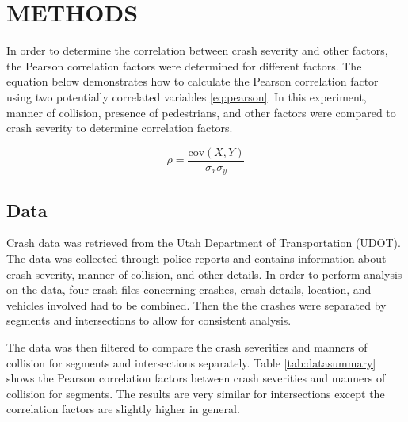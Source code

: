 \documentclass[3p, authoryear]{elsarticle} %
\begin{document}
\hypertarget{methods}{%
\section{METHODS}\label{methods}}

In order to determine the correlation between crash severity and other factors,
the Pearson correlation factors were determined for different factors. The
equation below demonstrates how to calculate the Pearson correlation factor
using two potentially correlated variables \eqref{eq:pearson}. In this experiment,
manner of collision, presence of pedestrians, and other factors were compared to
crash severity to determine correlation factors.

\begin{equation}
  \rho = \frac{\text{cov}(X,Y)}{\sigma_x \sigma_y}
  \label{eq:pearson}
\end{equation}

\hypertarget{data}{%
\subsection{Data}\label{data}}

Crash data was retrieved from the Utah Department of Transportation (UDOT). The data was collected through police reports and contains information about crash severity, manner of collision, and other details. In order to perform analysis on the data, four crash files concerning crashes, crash details, location, and vehicles involved had to be combined. Then the the crashes were separated by segments and intersections to allow for consistent analysis.

The data was then filtered to compare the crash severities and manners of collision for segments and intersections separately.
Table \ref{tab:datasummary} shows the Pearson correlation factors between crash severities and manners of collision for segments. The results are very similar for intersections except the correlation factors are slightly higher in general.
\end{document}
